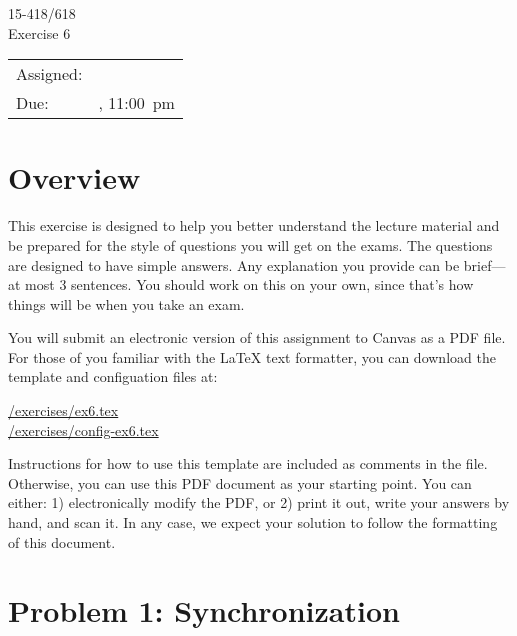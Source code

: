 \documentclass[11pt]{article}
\newcommand{\cref}[2]{\href{#1}{\color{blue}#2}}
\begin{document}
                          
\vspace*{0.3in}                            
\begin{center}
\LARGE
15-418/618 \thisterm{} \\
Exercise 6
\end{center}

\begin{center}
\Large        
\begin{tabular}{ll}
\hline             
Assigned: & \dateassigned{}  \\
Due: &  \datedue{}, 11:00~pm  \\
\hline       
\end{tabular}
\end{center} 

\section*{Overview}

This exercise is designed to help you better understand the lecture
material and be prepared for the style of questions you will get on
the exams.  The questions are designed to have simple answers.  Any
explanation you provide can be brief---at most 3 sentences.  You
should work on this on your own, since that's how things will be when
you take an exam.

You will submit an electronic version of this assignment to Canvas 
as a PDF file.  For those of you familiar with the \LaTeX{} text 
formatter, you can download the template and configuation files at: 
\begin{center} 
  \cref{\actualcoursehome/exercises/ex6.tex}{\visiblecoursehome/exercises/ex6.tex}\\
  \cref{\actualcoursehome/exercises/config-ex6.tex}{\visiblecoursehome/exercises/config-ex6.tex}
\end{center} 
Instructions for how to use this template are included as comments in 
the file.  Otherwise, you can use this PDF document as your starting 
point.  You can either: 1) electronically modify the PDF, or 2) print 
it out, write your answers by hand, and scan it.  In any case, we 
expect your solution to follow the formatting of this document. 

\newpage 

\section*{Problem 1: Synchronization}
\end{document}
